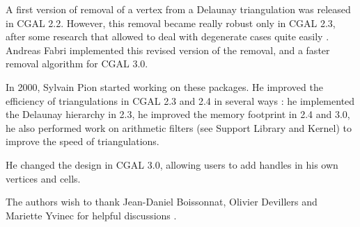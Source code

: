 A first version of removal of a vertex from a Delaunay triangulation
was released in CGAL 2.2. However, this removal became really robust
only in CGAL 2.3, after some research that allowed to deal with
degenerate cases quite easily \cite{cgal:dt-pvr3d-03}. Andreas Fabri
implemented this revised version of the removal, and a faster removal
algorithm for CGAL 3.0.

In 2000, Sylvain Pion started working on these packages.  He improved
the efficiency of triangulations in CGAL 2.3 and 2.4 in several ways
\cite{cgal:bdpty-tc-02}: he implemented the Delaunay hierarchy
\cite{cgal:d-dh-02} in 2.3, he improved the memory footprint in 2.4 and
3.0, he also performed work on arithmetic filters \cite{cgal:dp-eegpd-03}
(see Support Library and Kernel) to improve the speed of
triangulations.

He changed the design in CGAL 3.0, allowing users to add handles in
his own vertices and cells. 


The authors wish to thank Jean-Daniel Boissonnat, Olivier Devillers
and Mariette Yvinec for helpful discussions \cite{bdty-tcgal-00}.
